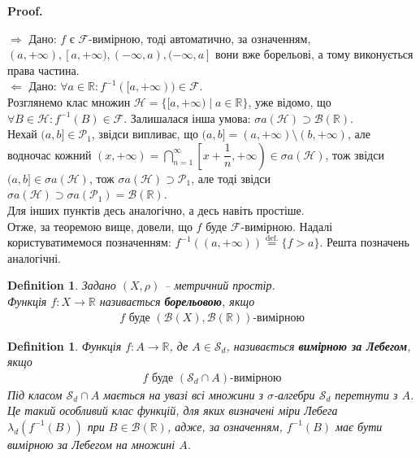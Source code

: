 \documentclass[a4paper, 10pt]{article}
\makeatletter
\def\rightproof{$\boxed{\Rightarrow}$ }
\def\leftproof{$\boxed{\Leftarrow}$ }
\theoremstyle{theoremdd}
\newtheorem{definition}[theorem]{Definition}
\renewenvironment{proof}[1][Proof.\\]{\par
\pushQED{\hfill \qed}%
\normalfont \topsep6\p@\@plus6\p@\relax
\trivlist
\item\relax
{\bfseries
#1\@addpunct{.}}\hspace\labelsep\ignorespaces
}{%
\popQED\endtrivlist\@endpefalse
}
\makeatother
\begin{document}
\begin{proof}
\rightproof Дано: $f$ є $\mathcal{F}$-вимірною, тоді автоматично, за означенням, $(a,+\infty),[a,+\infty),(-\infty,a),(-\infty,a]$ вони вже борельові, а тому виконується права частина.
\bigskip \\
\leftproof Дано: $\forall a \in \mathbb{R}: f^{-1}([a,+\infty)) \in \mathcal{F}$.\\
Розглянемо клас множин $\mathcal{H} = \{ [a,+\infty) \mid a \in \mathbb{R} \}$, уже відомо, що $\forall B \in \mathcal{H}: f^{-1}(B) \in \mathcal{F}$. Залишалася інша умова: $\sigma a(\mathcal{H}) \supset \mathcal{B}(\mathbb{R})$.\\
Нехай $(a,b] \in \mathcal{P}_1$, звідси випливає, що $(a,b] = (a,+\infty) \setminus (b,+\infty)$, але водночас кожний $(x,+\infty) = \displaystyle\bigcap_{n=1}^\infty \left[ x+\dfrac{1}{n},+\infty \right) \in \sigma a(\mathcal{H})$, тож звідси $(a,b] \in \sigma a(\mathcal{H})$, тож $\sigma a(\mathcal{H}) \supset \mathcal{P}_1$, але тоді звідси $\sigma a(\mathcal{H}) \supset \sigma a(\mathcal{P}_1) = \mathcal{B}(\mathbb{R})$.\\
Для інших пунктів десь аналогічно, а десь навіть простіше.\\
Отже, за теоремою вище, довели, що $f$ буде $\mathcal{F}$-вимірною.
\end{proof}
\noindent
Надалі користуватимемося позначенням: $f^{-1}((a,+\infty)) \overset{\text{def.}}{=} \{f > a\}$. Решта позначень аналогічні.

\begin{definition}
Задано $(X,\rho)$ -- метричний простір.\\
Функція $f \colon X \to \mathbb{R}$ називається \textbf{борельовою}, якщо
\begin{align*}
f \text{ буде } (\mathcal{B}(X),\mathcal{B}(\mathbb{R}))\text{-вимірною}
\end{align*}
\end{definition}

\begin{definition}
Функція $f \colon A \to \mathbb{R}$, де $A \in \mathcal{S}_d$, називається \textbf{вимірною за Лебегом}, якщо
\begin{align*}
f \text{ буде } (\mathcal{S}_d \cap A)\text{-вимірною}
\end{align*}
Під класом $\mathcal{S}_d \cap A$ мається на увазі всі множини з $\sigma$-алгебри $\mathcal{S}_d$ перетнути з $A$.\\
Це такий особливий клас функцій, для яких визначені міри Лебега $\lambda_d(f^{-1}(B))$ при $B \in \mathcal{B}(\mathbb{R})$, адже, за означенням, $f^{-1}(B)$ має бути вимірною за Лебегом на множині $A$.
\end{definition}
\end{document}
